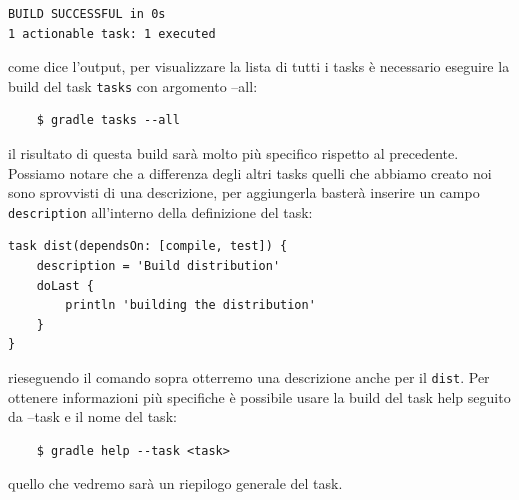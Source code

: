 \documentclass{article}
\begin{document}
\begin{flushleft}
\begin{verbatim}
BUILD SUCCESSFUL in 0s
1 actionable task: 1 executed \end{verbatim}
come dice l'output, per visualizzare la lista di tutti i tasks è necessario eseguire la build del task \texttt{tasks} con argomento --all:
\begin{verbatim}
    $ gradle tasks --all \end{verbatim}
    il risultato di questa build sarà molto più specifico rispetto al precedente. Possiamo notare che a differenza degli altri tasks quelli che abbiamo creato noi sono sprovvisti di una descrizione, per aggiungerla basterà inserire un campo \texttt{description} all'interno della definizione del task:
    \begin{verbatim}
task dist(dependsOn: [compile, test]) {
    description = 'Build distribution'
    doLast {
        println 'building the distribution'
    }
} \end{verbatim}
rieseguendo il comando sopra otterremo una descrizione anche per il \texttt{dist}. Per ottenere informazioni più specifiche è possibile usare la build del task help seguito da --task e il nome del task:
\begin{verbatim}
    $ gradle help --task <task> \end{verbatim}
quello che vedremo sarà un riepilogo generale del task.


\end{flushleft}
\end{document}

